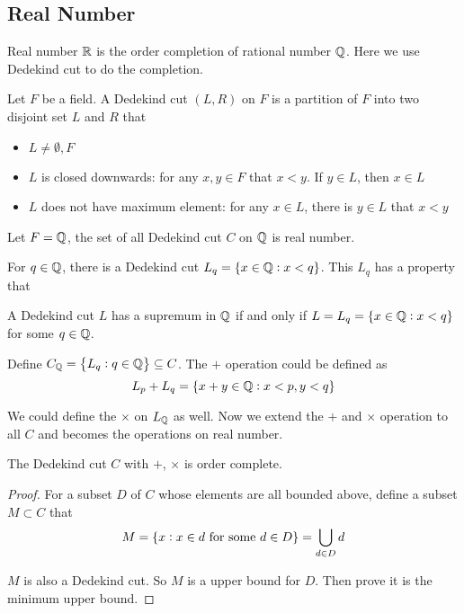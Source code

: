 \subsection{Real Number}

Real number $\mathbb{R}$ is the order completion of rational number $\mathbb{Q}$. Here we use Dedekind cut to do the completion.

\begin{definition}
    Let $F$ be a field. A Dedekind cut $(L,R)$ on $F$ is a partition of $F$ into two disjoint set $L$ and $R$ that
    \begin{itemize}
        \item $L \neq \emptyset, F$
        \item $L$ is closed downwards: for any $x,y \in F$ that $x < y$. If $y \in L$, then $x \in L$
        \item $L$ does not have maximum element: for any $x \in L$, there is $y\in L$ that $x < y$
    \end{itemize}
\end{definition}

Let $F=\mathbb{Q}$, the set of all Dedekind cut $C$ on $\mathbb{Q}$ is real number.

For $q \in \mathbb{Q}$, there is a Dedekind cut $L_q = \set{x\in \mathbb{Q}: x < q}$. This $L_q$ has a property that
\begin{theorem}
    A Dedekind cut $L$ has a supremum in $\mathbb{Q}$ if and only if $L = L_q = \set{x \in \mathbb{Q}: x < q}$ for some $q\in \mathbb{Q}$.
\end{theorem}

\begin{definition}
    Define $C_{\mathbb{Q}} = \set{L_q: q \in \mathbb{Q}} \subseteq C$. The $+$ operation could be defined as
\begin{equation}
    L_p + L_q = \set{x + y \in \mathbb{Q}: x < p, y < q}
\end{equation}
\end{definition}


We could define the $\times$ on $L_{\mathbb{Q}}$ as well. Now we extend the $+$ and $\times$ operation to all $C$ and becomes the operations on real number.

\begin{theorem}
    The Dedekind cut $C$ with $+$, $\times$ is order complete.    
\end{theorem}
\begin{proof}
    For a subset $D$ of $C$ whose elements are all bounded above, define a subset $M \subset C$ that
    \begin{equation}
        M = \set{x: x \in d \text{ for some } d \in D} =\bigcup_{d \in D} d
    \end{equation}
    
    $M$ is also a Dedekind cut. So $M$ is a upper bound for $D$. Then prove it is the minimum upper bound.
\end{proof}


